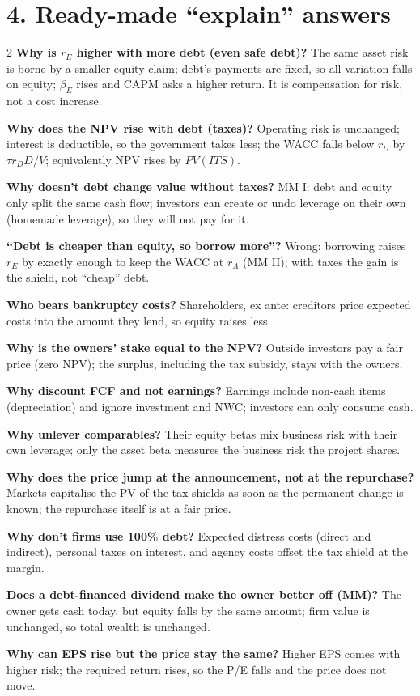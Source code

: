 \documentclass[10pt,a4paper]{article}
\begin{document}
\section*{4. Ready-made ``explain'' answers}
\begin{multicols}{2}\small
\textbf{Why is $r_E$ higher with more debt (even safe debt)?} The same asset risk is borne by a smaller
equity claim; debt's payments are fixed, so all variation falls on equity; $\beta_E$ rises and CAPM asks
a higher return. It is compensation for risk, not a cost increase.

\textbf{Why does the NPV rise with debt (taxes)?} Operating risk is unchanged; interest is deductible, so
the government takes less; the WACC falls below $r_U$ by $\tau r_DD/V$; equivalently NPV rises by
$PV(ITS)$.

\textbf{Why doesn't debt change value without taxes?} MM I: debt and equity only split the same cash
flow; investors can create or undo leverage on their own (homemade leverage), so they will not pay for
it.

\textbf{``Debt is cheaper than equity, so borrow more''?} Wrong: borrowing raises $r_E$ by exactly
enough to keep the WACC at $r_A$ (MM II); with taxes the gain is the shield, not ``cheap'' debt.

\textbf{Who bears bankruptcy costs?} Shareholders, ex ante: creditors price expected costs into the
amount they lend, so equity raises less.

\textbf{Why is the owners' stake equal to the NPV?} Outside investors pay a fair price (zero NPV);
the surplus, including the tax subsidy, stays with the owners.

\textbf{Why discount FCF and not earnings?} Earnings include non-cash items (depreciation) and ignore
investment and NWC; investors can only consume cash.

\textbf{Why unlever comparables?} Their equity betas mix business risk with their own leverage; only
the asset beta measures the business risk the project shares.

\textbf{Why does the price jump at the announcement, not at the repurchase?} Markets capitalise the PV
of the tax shields as soon as the permanent change is known; the repurchase itself is at a fair price.

\textbf{Why don't firms use 100\% debt?} Expected distress costs (direct and indirect), personal
taxes on interest, and agency costs offset the tax shield at the margin.

\textbf{Does a debt-financed dividend make the owner better off (MM)?} The owner gets cash today, but
equity falls by the same amount; firm value is unchanged, so total wealth is unchanged.

\textbf{Why can EPS rise but the price stay the same?} Higher EPS comes with higher risk; the required
return rises, so the P/E falls and the price does not move.
\end{multicols}
\end{document}
